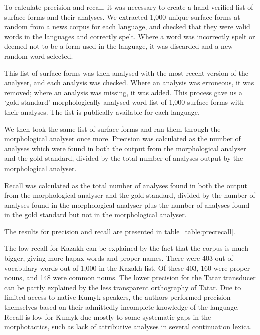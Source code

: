 \documentclass[a4paper,11pt,twocolumn]{article}
\begin{document}
To calculate precision and recall, it was necessary to create a hand-verified list of surface forms and their analyses.  We extracted 1,000 unique surface forms at random from a news corpus for each language, and checked that they were valid words in the languages and correctly spelt.  Where a word was incorrectly spelt or deemed not to be a form used in the language, it was discarded and a new random word selected.

This list of surface forms was then analysed with the most recent version of the analyser, and each analysis was checked.  Where an analysis was erroneous, it was removed; where an analysis was missing, it was added.  This process gave us a `gold standard' morphologically analysed word list of 1,000 surface forms with their analyses.  The list is publically available for each language.%

We then took the same list of surface forms and ran them through the morphological analyser once more.  Precision was calculated as the number of analyses which were found in both the output from the morphological analyser and the gold standard, divided by the total number of analyses output by the morphological analyser.

Recall was calculated as the total number of analyses found in both the output from the morphological analyser and the gold standard, divided by the number of analyses found in the morphological analyser plus the number of analyses found in the gold standard but not in the morphological analyser.

The results for precision and recall are presented in table~\ref{table:precrecall}. 

The low recall for Kazakh can be explained by the fact that the corpus is much bigger, giving 
more hapax words and proper names. There were 403 out-of-vocabulary words out of 1,000 in the Kazakh list.
Of these 403, 160 were proper nouns, and 148 were common nouns. The lower precision for the 
Tatar transducer can be partly explained by the less transparent orthography of Tatar.  Due to limited access to native Kumyk speakers, the authors performed precision themselves based on their admittedly incomplete knowledge of the language.  Recall is low for Kumyk due mostly to some systematic gaps in the morphotactics, such as lack of attributive analyses in several continuation lexica.

\end{document}
